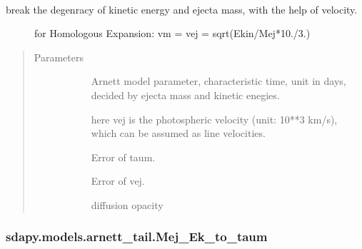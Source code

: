 \documentclass[letterpaper,10pt,english]{sphinxmanual}
\begin{document}
\begin{fulllineitems}
\label{\detokenize{generated/sdapy.models.arnett_tail.taum_to_Mej_Ek_1:sdapy.models.arnett_tail.taum_to_Mej_Ek_1}}~\begin{description}
\item[{break the degenracy of kinetic energy and ejecta mass, with the help of velocity.}] \leavevmode
for Homologous Expansion: vm = vej = sqrt(Ekin/Mej*10./3.)

\end{description}
\begin{quote}\begin{description}
\item[{Parameters}] \leavevmode\begin{description}
\item[{}] \leavevmode{[}\sphinxtitleref{float}{]}
Arnett model parameter, characteristic time, unit in days, decided by ejecta mass and kinetic enegies.

\item[{}] \leavevmode{[}\sphinxtitleref{float}{]}
here vej is the photospheric velocity (unit: 10**3 km/s), which can be assumed as line velocities.

\item[{}] \leavevmode{[}\sphinxtitleref{float}{]}
Error of taum.

\item[{}] \leavevmode{[}\sphinxtitleref{float}{]}
Error of vej.

\item[{}] \leavevmode{[}\sphinxtitleref{float}{]}
diffusion opacity

\end{description}

\end{description}\end{quote}

\end{fulllineitems}



\subsubsection{sdapy.models.arnett\_tail.Mej\_Ek\_to\_taum}
\label{\detokenize{generated/sdapy.models.arnett_tail.Mej_Ek_to_taum:sdapy-models-arnett-tail-mej-ek-to-taum}}\label{\detokenize{generated/sdapy.models.arnett_tail.Mej_Ek_to_taum::doc}}
\end{document}
